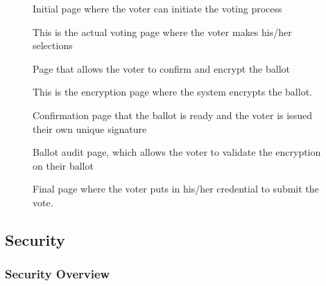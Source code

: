 \begin{figure}
  \centering
  \caption{Initial page where the voter can initiate the voting process}
  \label{fig:helios-initial}
\end{figure}

\begin{figure}
  \centering
  \caption{This is the actual voting page where the voter makes his/her selections}
  \label{fig:helios-voting}
\end{figure}

\begin{figure}
  \centering
  \caption{Page that allows the voter to confirm and encrypt the ballot}
  \label{fig:helios-confirm}
\end{figure}

\begin{figure}
  \centering
  \caption{This is the encryption page where the system encrypts the ballot.}
  \label{fig:helios-encrypt}
\end{figure}

\begin{figure}
  \centering
  \caption{Confirmation page that the ballot is ready and the voter is issued their own unique signature}
  \label{fig:helios-signature}
\end{figure}

\begin{figure}
  \centering
  \caption{Ballot audit page, which allows the voter to validate the encryption on their ballot}
  \label{fig:helios-audit}
\end{figure}

\begin{figure}
  \centering
  \caption{Final page where the voter puts in his/her credential to submit the vote.}
  \label{fig:helios-submit}
\end{figure}

\subsection{Security}

\subsubsection{Security Overview}

